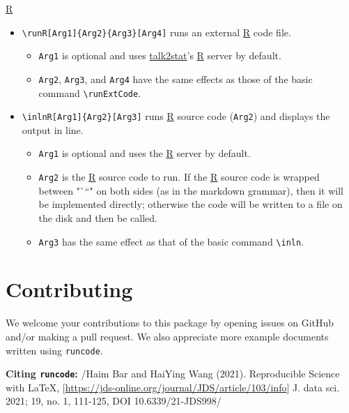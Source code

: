 \documentclass{ltxdoc}
\begin{document}
\href{https://www.r-project.org/}{R}

\begin{itemize}
\item \texttt{\textbackslash{}runR[Arg1]\{Arg2\}\{Arg3\}[Arg4]} runs an external
\href{https://www.r-project.org/}{R} code file.
\begin{itemize}
\item \texttt{Arg1} is optional and uses
\href{https://pypi.org/project/talk2stat/}{talk2stat}'s
\href{https://www.r-project.org/}{R} server by default.
\item \texttt{Arg2}, \texttt{Arg3}, and \texttt{Arg4} have the same effects as those of the
basic command \texttt{\textbackslash{}runExtCode}.
\end{itemize}
\item \texttt{\textbackslash{}inlnR[Arg1]\{Arg2\}[Arg3]} runs \href{https://www.r-project.org/}{R}
source code (\texttt{Arg2}) and displays the output in line.
\begin{itemize}
\item \texttt{Arg1} is optional and uses the \href{https://www.r-project.org/}{R}
server by default.
\item \texttt{Arg2} is the \href{https://www.r-project.org/}{R} source code to run.
If the \href{https://www.r-project.org/}{R} source code is wrapped
between "```" on both sides (as in the markdown grammar), then it
will be implemented directly; otherwise the code will be written to
a file on the disk and then be called.
\item \texttt{Arg3} has the same effect as that of the basic command \texttt{\textbackslash{}inln}.
\end{itemize}
\end{itemize}


\section{Contributing}
\label{sec:orgc03356d}
We welcome your contributions to this package by opening issues on
GitHub and/or making a pull request. We also appreciate more example
documents written using \texttt{runcode}.


\textbf{Citing \texttt{runcode}:} /Haim Bar and HaiYing Wang (2021). Reproducible
Science with \LaTeX{},
[\url{https://jds-online.org/journal/JDS/article/103/info}] J. data sci. 2021;
19, no. 1, 111-125, DOI 10.6339/21-JDS998/
\end{document}
